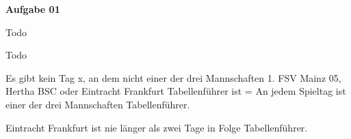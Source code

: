 \documentclass[a4paper,10pt]{article}
\begin{document}
	\parindent0pt
	\textbf{Aufgabe 01}
	\begin{compactenum} [(a)]
		\item \begin{compactenum} [(i)]
			\item Todo
			\item Todo
		\end{compactenum}
		\item \begin{compactenum} [(i)]
			\item Es gibt kein Tag x,  an dem nicht einer der drei Mannschaften 1. FSV Mainz 05, Hertha BSC oder Eintracht Frankfurt Tabellenführer ist = An jedem Spieltag ist einer der drei Mannschaften Tabellenführer.
			\item Eintracht Frankfurt ist nie länger als zwei Tage in Folge Tabellenführer.
		\end{compactenum}
	\end{compactenum}
\end{document}

